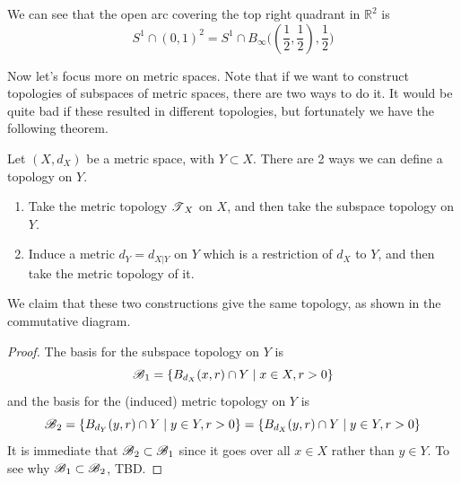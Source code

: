     \begin{example}
      We can see that the open arc covering the top right quadrant in $\mathbb{R}^2$ is 
      \begin{equation}
        S^1 \cap (0, 1)^2 = S^1 \cap B_\infty \big( (\frac{1}{2}, \frac{1}{2}), \frac{1}{2} \big)
      \end{equation}
    \end{example} 

    Now let's focus more on metric spaces. Note that if we want to construct topologies of subspaces of metric spaces, there are two ways to do it. It would be quite bad if these resulted in different topologies, but fortunately we have the following theorem. 

    \begin{theorem}
      Let $(X, d_X)$ be a metric space, with $Y \subset X$. There are 2 ways we can define a topology on $Y$. 
      \begin{enumerate}
        \item Take the metric topology $\T_X$ on $X$, and then take the subspace topology on $Y$. 
        \item Induce a metric $d_Y = d_{X | Y}$ on $Y$ which is a restriction of $d_X$ to $Y$, and then take the metric topology of it. 
      \end{enumerate}
      We claim that these two constructions give the same topology, as shown in the commutative diagram. 

      \begin{figure}[H]
        \centering 
        \caption{} 
        \label{fig:same_construction}
      \end{figure}
    \end{theorem}
    \begin{proof}
      The basis for the subspace topology on $Y$ is 
      \begin{equation}
        \B_1 = \{B_{d_X} (x, r) \cap Y \mid x \in X, r > 0 \}
      \end{equation} 
      and the basis for the (induced) metric topology on $Y$ is 
      \begin{equation}
        \B_2 = \{B_{d_Y} (y, r) \cap Y \mid y \in Y, r > 0 \} = \{B_{d_X} (y, r) \cap Y \mid y \in Y, r > 0 \}
      \end{equation} 
      It is immediate that $\B_2 \subset \B_1$ since it goes over all $x \in X$ rather than $y \in Y$. To see why $\B_1 \subset \B_2$, TBD. 
    \end{proof}

